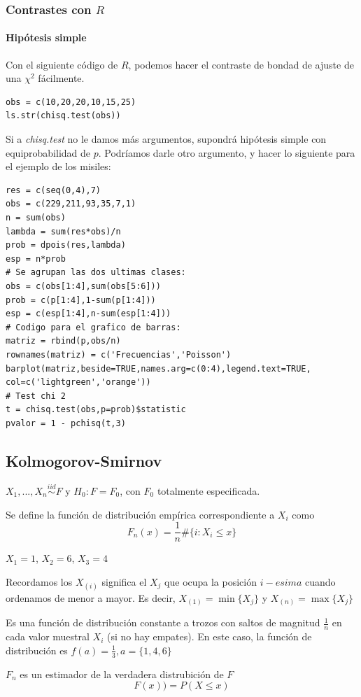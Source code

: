 \subsubsection{Contrastes con $R$}
\paragraph{Hipótesis simple}
Con el siguiente código de $R$, podemos hacer el contraste de bondad de ajuste de una $\chi^2$ fácilmente.

\begin{lstlisting}[style=mystyle]
obs = c(10,20,20,10,15,25)
ls.str(chisq.test(obs))
\end{lstlisting}

Si a \textit{chisq.test} no le damos más argumentos, supondrá hipótesis simple con equiprobabilidad de $p$. Podríamos darle otro argumento, y hacer lo siguiente para el ejemplo de los misiles:

\begin{lstlisting}[style=mystyle]
res = c(seq(0,4),7)
obs = c(229,211,93,35,7,1)
n = sum(obs)
lambda = sum(res*obs)/n
prob = dpois(res,lambda)
esp = n*prob
# Se agrupan las dos ultimas clases:
obs = c(obs[1:4],sum(obs[5:6]))
prob = c(p[1:4],1-sum(p[1:4]))
esp = c(esp[1:4],n-sum(esp[1:4]))
# Codigo para el grafico de barras:
matriz = rbind(p,obs/n)
rownames(matriz) = c('Frecuencias','Poisson')
barplot(matriz,beside=TRUE,names.arg=c(0:4),legend.text=TRUE,
col=c('lightgreen','orange'))
# Test chi 2
t = chisq.test(obs,p=prob)$statistic
pvalor = 1 - pchisq(t,3)
\end{lstlisting}


\subsection{Kolmogorov-Smirnov}

\begin{defn}

$X_1,...,X_n \overset{iid}{\sim} F$ y $H_0 : F=F_0$, con $F_0$ totalmente especificada.

Se define la función de distribución empírica correspondiente a $X_i$ como \[F_n(x) = \frac{1}{n}\#\{ i : X_i\leq x\}\]

\end{defn}

\begin{example}
$X_1 = 1$, $X_2 = 6$, $X_3 = 4$

Recordamos los  $X_{(i)}$ significa el $X_j$ que ocupa la posición $i-esima$ cuando ordenamos de menor a mayor. Es decir, $X_{(1)} = \min\{X_j\}$ y $X_{(n)} = \max\{X_j\}$ 

Es una función de distribución constante a trozos con saltos de magnitud $\frac{1}{n}$ en cada valor muestral $X_i$ (si no hay empates). En este caso, la función de distribución es $f(a) = \frac{1}{3}, a=\{1,4,6\}$

$F_n$ es un estimador de la verdadera distrubición de $F$ \[F(x)) = P(X\leq x)\]
\end{example}

